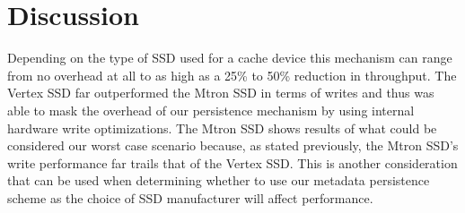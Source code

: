 \section{Discussion}
\label{sec:discussion}

Depending on the type of SSD used for a cache device this mechanism
can range from no overhead at all to as high as a 25\% to 50\%
reduction in throughput. The Vertex SSD far outperformed the Mtron SSD
in terms of writes and thus was able to mask the overhead of our
persistence mechanism by using internal hardware write
optimizations. The Mtron SSD shows results of what could be considered
our worst case scenario because, as stated previously, the Mtron SSD's
write performance far trails that of the Vertex SSD. This is another
consideration that can be used when determining whether to use our
metadata persistence scheme as the choice of SSD manufacturer will
affect performance.

